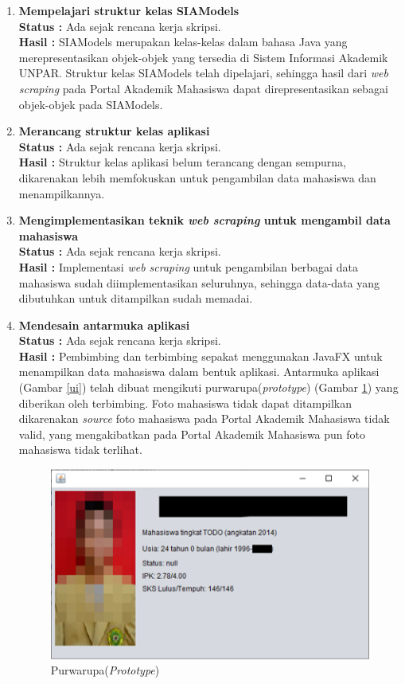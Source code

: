 \documentclass[a4paper,twoside]{article}
\begin{document}
\begin{enumerate}
        \item \textbf{Mempelajari struktur kelas SIAModels}\\
		{\bf Status :} Ada sejak rencana kerja skripsi.\\
		{\bf Hasil :} SIAModels merupakan kelas-kelas dalam bahasa Java yang merepresentasikan objek-objek yang tersedia di Sistem Informasi Akademik UNPAR.
		Struktur kelas SIAModels telah dipelajari, sehingga hasil dari \textit{web scraping} pada Portal Akademik Mahasiswa dapat direpresentasikan sebagai objek-objek pada SIAModels.
		
		
		\item \textbf{Merancang struktur kelas aplikasi}\\
		{\bf Status :} Ada sejak rencana kerja skripsi.\\
		{\bf Hasil :} Struktur kelas aplikasi belum terancang dengan sempurna, dikarenakan lebih memfokuskan untuk pengambilan data mahasiswa dan menampilkannya.
		
		
		\item \textbf{Mengimplementasikan teknik \textit{web scraping} untuk mengambil data mahasiswa}\\
		{\bf Status :} Ada sejak rencana kerja skripsi.\\
		{\bf Hasil :} Implementasi \textit{web scraping} untuk pengambilan berbagai data mahasiswa sudah diimplementasikan seluruhnya, sehingga data-data yang dibutuhkan untuk ditampilkan sudah memadai.
		
		
		\item \textbf{Mendesain antarmuka aplikasi}\\
		{\bf Status :} Ada sejak rencana kerja skripsi.\\
		{\bf Hasil :} Pembimbing dan terbimbing sepakat menggunakan JavaFX untuk menampilkan data mahasiswa dalam bentuk aplikasi. Antarmuka aplikasi (Gambar \ref{ui}) telah dibuat mengikuti purwarupa(\textit{prototype}) (Gambar \ref{purwarupa}) yang diberikan oleh terbimbing. Foto mahasiswa tidak dapat ditampilkan dikarenakan \textit{source} foto mahasiswa pada Portal Akademik Mahasiswa tidak valid, yang mengakibatkan pada Portal Akademik Mahasiswa pun foto mahasiswa tidak terlihat.
		
		\begin{figure}[H]
        	\centering
        	\includegraphics{prototype.png}
        	\caption{Purwarupa(\textit{Prototype})} 
        	\label{purwarupa}
        \end{figure}
        

\end{enumerate}
\end{document}

